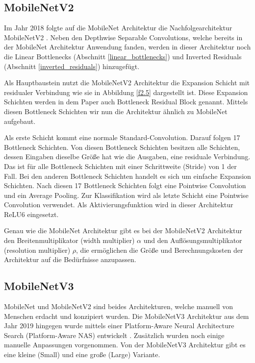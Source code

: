 \subsection{MobileNetV2}
Im Jahr 2018 folgte auf die MobileNet Architektur die Nachfolgearchitektur MobileNetV2 \cite{sandler_mobilenetv2_2019}. Neben den Depthwise Separable Convolutions, welche bereits in der MobileNet Architektur Anwendung fanden, werden in dieser Architektur noch die Linear Bottlenecks (Abschnitt \ref{linear_bottlenecks}) und Inverted Residuals (Abschnitt \ref{inverted_residuals}) hinzugefügt.

Als Hauptbaustein nutzt die MobileNetV2 Architektur die Expansion Schicht mit residualer Verbindung wie sie in Abbildung \ref{f2.5} dargestellt ist. Diese Expansion Schichten werden in dem Paper auch Bottleneck Residual Block genannt. Mittels diesen Bottleneck Schichten wir nun die Architektur ähnlich zu MobileNet aufgebaut. 

Als erste Schicht kommt eine normale Standard-Convolution. Darauf folgen 17 Bottleneck Schichten. Von diesen Bottleneck Schichten besitzen alle Schichten, dessen Eingaben dieselbe Größe hat wie die Ausgaben, eine residuale Verbindung. Das ist für alle Bottleneck Schichten mit einer Schrittweite (Stride) von 1 der Fall. Bei den anderen Bottleneck Schichten handelt es sich um einfache Expansion Schichten. Nach diesen 17 Bottleneck Schichten folgt eine Pointwise Convolution und ein Average Pooling. Zur Klassifikation wird als letzte Schicht eine Pointwise Convolution verwendet. Als Aktivierungsfunktion wird in dieser Architektur ReLU6 eingesetzt.

Genau wie die MobileNet Architektur gibt es bei der MobileNetV2 Architektur den Breitenmultiplikator (width multiplier) $\alpha$ und den Auflösungsmultiplikator (resolution multiplier) $\rho$, die ermöglichen die Größe und Berechnungskosten der Architektur auf die Bedürfnisse anzupassen.


\subsection{MobileNetV3}
\label{mobilenetv3}
MobileNet und MobileNetV2 sind beides Architekturen, welche manuell von Menschen erdacht und konzipiert wurden. Die MobileNetV3 Architektur aus dem Jahr 2019 hingegen wurde mittels einer Platform-Aware Neural Architecture Search (Platform-Aware NAS) entwickelt \cite{howard_searching_2019}. Zusätzlich wurden noch einige manuelle Anpassungen vorgenommen. Von der MobileNetV3 Architektur gibt es eine kleine (Small) und eine große (Large) Variante.

